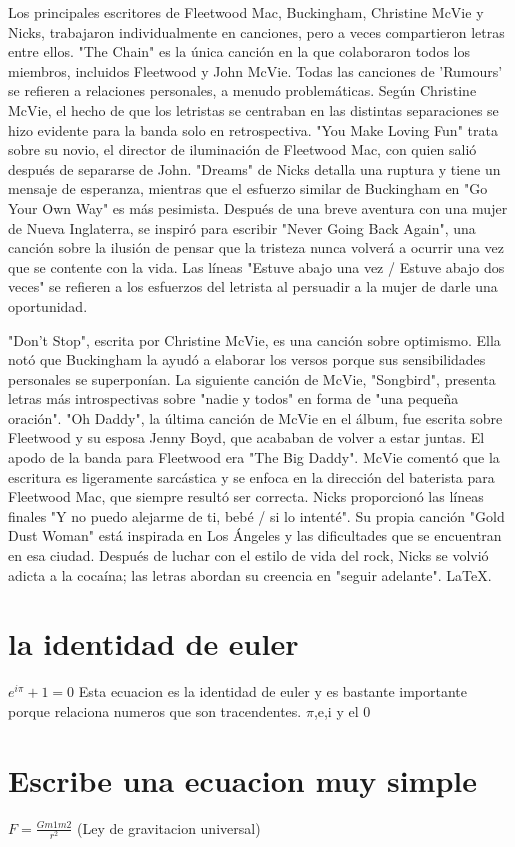 \documentclass[a4paper,10pt]{article}
\begin{document}
Los principales escritores de Fleetwood Mac, Buckingham, Christine McVie y Nicks, trabajaron individualmente en canciones, pero a veces compartieron letras entre ellos. "The Chain" es la única canción en la que colaboraron todos los miembros, incluidos Fleetwood y John McVie. Todas las canciones de 'Rumours' se refieren a relaciones personales, a menudo problemáticas. Según Christine McVie, el hecho de que los letristas se centraban en las distintas separaciones se hizo evidente para la banda solo en retrospectiva. "You Make Loving Fun" trata sobre su novio, el director de iluminación de Fleetwood Mac, con quien salió después de separarse de John. "Dreams" de Nicks detalla una ruptura y tiene un mensaje de esperanza, mientras que el esfuerzo similar de Buckingham en "Go Your Own Way" es más pesimista. Después de una breve aventura con una mujer de Nueva Inglaterra, se inspiró para escribir "Never Going Back Again", una canción sobre la ilusión de pensar que la tristeza nunca volverá a ocurrir una vez que se contente con la vida. Las líneas "Estuve abajo una vez / Estuve abajo dos veces" se refieren a los esfuerzos del letrista al persuadir a la mujer de darle una oportunidad. 

"Don't Stop", escrita por Christine McVie, es una canción sobre optimismo. Ella notó que Buckingham la ayudó a elaborar los versos porque sus sensibilidades personales se superponían. La siguiente canción de McVie, "Songbird", presenta letras más introspectivas sobre "nadie y todos" en forma de "una pequeña oración". "Oh Daddy", la última canción de McVie en el álbum, fue escrita sobre Fleetwood y su esposa Jenny Boyd, que acababan de volver a estar juntas. El apodo de la banda para Fleetwood era "The Big Daddy". McVie comentó que la escritura es ligeramente sarcástica y se enfoca en la dirección del baterista para Fleetwood Mac, que siempre resultó ser correcta. Nicks proporcionó las líneas finales "Y no puedo alejarme de ti, bebé / si lo intenté". Su propia canción "Gold Dust Woman" está inspirada en Los Ángeles y las dificultades que se encuentran en esa ciudad. Después de luchar con el estilo de vida del rock, Nicks se volvió adicta a la cocaína; las letras abordan su creencia en "seguir adelante".  \LaTeX.\\ %
\section{la identidad de euler}
$ e^{i \pi} + 1 = 0 $  %
Esta ecuacion es la identidad de euler y es bastante importante porque relaciona numeros que son tracendentes.
$\pi $,e,i y el 0
\section{Escribe una ecuacion muy simple}
$F = \frac{Gm1m2}{r^2}$ (Ley de gravitacion universal)
\end{document}
